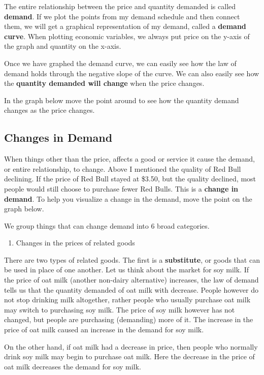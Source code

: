\documentclass[
]{book}
\providecommand{\tightlist}{%
  \setlength{\itemsep}{0pt}\setlength{\parskip}{0pt}}
\begin{document}
The entire relationship between the price and quantity demanded is called \textbf{demand}. If we plot the points from my demand schedule and then connect them, we will get a graphical representation of my demand, called a \textbf{demand curve}. When plotting economic variables, we always put price on the y-axis of the graph and quantity on the x-axis.

Once we have graphed the demand curve, we can easily see how the law of demand holds through the negative slope of the curve. We can also easily see how the \textbf{quantity demanded will change} when the price changes.

In the graph below move the point around to see how the quantity demand changes as the price changes.

\subsection{Changes in Demand}\label{changes-in-demand}

When things other than the price, affects a good or service it cause the demand, or entire relationship, to change. Above I mentioned the quality of Red Bull declining. If the price of Red Bull stayed at \$3.50, but the quality declined, most people would still choose to purchase fewer Red Bulls. This is a \textbf{change in demand}. To help you visualize a change in the demand, move the point on the graph below.

We group things that can change demand into 6 broad categories.

\begin{enumerate}
\def\labelenumi{\arabic{enumi}.}
\tightlist
\item
  Changes in the prices of related goods
\end{enumerate}

There are two types of related goods. The first is a \textbf{substitute}, or goods that can be used in place of one another. Let us think about the market for soy milk. If the price of oat milk (another non-dairy alternative) increases, the law of demand tells us that the quantity demanded of oat milk with decrease. People however do not stop drinking milk altogether, rather people who usually purchase oat milk may switch to purchasing soy milk. The price of soy milk however has not changed, but people are purchasing (demanding) more of it. The increase in the price of oat milk caused an increase in the demand for soy milk.

On the other hand, if oat milk had a decrease in price, then people who normally drink soy milk may begin to purchase oat milk. Here the decrease in the price of oat milk decreases the demand for soy milk.
\end{document}
